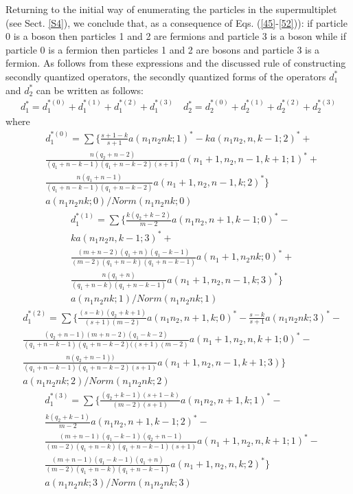 \documentclass[a4paper,12pt]{article}%
\begin{document}
Returning to the initial way of enumerating the particles
in the supermultiplet (see Sect. \ref{S4}), we conclude
that, as a consequence of Eqs. (\ref{45}-\ref{52})): if
particle 0 is a boson then particles 1 and 2 are fermions
and particle 3 is a boson while if particle 0 is a
fermion then particles 1 and 2 are bosons and particle 3
is a fermion. As follows from these expressions and the
discussed rule of constructing secondly quantized
operators, the secondly quantized forms of the operators
$d_1^*$ and $d_2^*$ can be written as follows:
\begin{eqnarray}
d_1^*=d_1^{*(0)}+d_1^{*(1)}+d_1^{*(2)}+d_1^{*(3)}\quad
d_2^*=d_2^{*(0)}+d_2^{*(1)}+d_2^{*(2)}+d_2^{*(3)}
\label{62}
\end{eqnarray}
where
\begin{eqnarray}
&d_1^{*(0)}=\sum \{\frac{s+1-k}{s+1}a(n_1n_2nk;1)^*-
ka(n_1n_2,n,k-1;2)^*+\nonumber\\
&\frac{n(q_2+n-2)}{(q_1+n-k-1)
(q_1+n-k-2)(s+1)}a(n_1+1,n_2,n-1,k+1;1)^*+\nonumber\\
&\frac{n(q_1+n-1)}{(q_1+n-k-1)(q_1+n-k-2)}
a(n_1+1,n_2,n-1,k;2)^*\}\nonumber\\
&a(n_1n_2nk;0)/Norm(n_1n_2nk;0)
\label{63}
\end{eqnarray}
\begin{eqnarray}
&d_1^{*(1)}=\sum\{\frac{k(q_2+k-2)}{m-2}
a(n_1n_2,n+1,k-1;0)^*-\nonumber\\
&ka(n_1n_2n,k-1;3)^*+\nonumber\\
&\frac{(m+n-2)(q_1+n)(q_1-k-1)}{(m-2)(q_1+n-k)(q_1+n-k-1)}
a(n_1+1,n_2nk;0)^*+\nonumber\\
&\frac{n(q_1+n)}{(q_1+n-k)(q_1+n-k-1)}
a(n_1+1,n_2,n-1,k;3)^*\}\nonumber\\
&a(n_1n_2nk;1)/Norm(n_1n_2nk;1)
\label{64}
\end{eqnarray}
\begin{eqnarray}
&d_1^{*(2)}=\sum\{\frac{(s-k)(q_2+k+1)}{(s+1)(m-2)}
a(n_1n_2,n+1,k;0)^*-\frac{s-k}{s+1}a(n_1n_2nk;3)^*-\nonumber\\
&\frac{(q_2+n-1)(m+n-2)(q_1-k-2)}{(q_1+n-k-1)(q_1+n-k-2)((s+1)(m-2)}
a(n_1+1,n_2,n,k+1;0)^*-\nonumber\\
&\frac{n(q_2+n-1))}{(q_1+n-k-1)(q_1+n-k-2)(s+1)}
a(n_1+1,n_2,n-1,k+1;3)\}\nonumber\\
&a(n_1n_2nk;2)/Norm(n_1n_2nk;2)
\label{65}
\end{eqnarray}
\begin{eqnarray}
&d_1^{*(3)}=\sum\{\frac{(q_2+k-1)(s+1-k)}{(m-2)(s+1)}
a(n_1n_2,n+1,k;1)^*-\nonumber\\
&\frac{k(q_2+k-1)}{m-2}
a(n_1n_2,n+1,k-1;2)^*-\nonumber\\
&\frac{(m+n-1)(q_1-k-1)(q_2+n-1)}{(m-2)(q_1+n-k)(q_1+n-k-1)(s+1)}
a(n_1+1,n_2,n,k+1;1)^*-\nonumber\\
&\frac{(m+n-1)(q_1-k-1)(q_1+n)}{(m-2)(q_1+n-k)(q_1+n-k-1)}
a(n_1+1,n_2,n,k;2)^*\}\nonumber\\
&a(n_1n_2nk;3)/Norm(n_1n_2nk;3)
\label{66}
\end{eqnarray}
\end{document}
